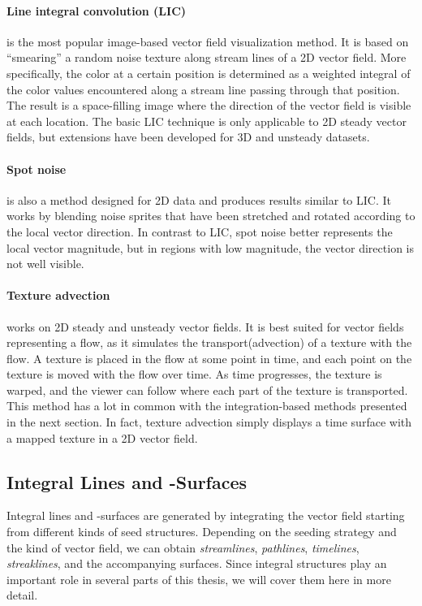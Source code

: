 %
\paragraph{Line integral convolution (\acs{LIC})} is the most
popular image-based vector field visualization method.
%
It is based on ``smearing'' a random noise texture along stream lines of a
\ac{2D} vector field.
%
More specifically, the color at a certain position is determined as a weighted
integral of the color values encountered along a stream line passing through
that position.
%
The result is a space-filling image where the direction of the vector field is
visible at each location.
%
The basic \ac{LIC} technique is only applicable to \ac{2D} steady vector fields,
but extensions have been developed for \ac{3D} and unsteady datasets.
%

%
\paragraph{Spot noise} is also a method designed for \ac{2D} data and produces
results similar to \ac{LIC}.
%
It works by blending noise sprites that have been stretched and rotated
according to the local vector direction.
%
In contrast to \ac{LIC}, spot noise better represents the local vector
magnitude, but in regions with low magnitude, the vector direction is not well
visible.
%

%
\paragraph{Texture advection} works on \ac{2D} steady and unsteady vector
fields.
%
It is best suited for vector fields representing a flow, as it simulates the
transport(advection) of a texture with the flow.
%
A texture is placed in the flow at some point in time, and each point on the
texture is moved with the flow over time.
%
As time progresses, the texture is warped, and the viewer can follow where each
part of the texture is transported.
%
This method has a lot in common with the integration-based methods presented in
the next section.
%
In fact, texture advection simply displays a time surface with a mapped texture
in a \ac{2D} vector field.
%

%
%
\subsection{Integral Lines and -Surfaces} %
\label{sub:integral_lines_and_surfaces}
%
Integral lines and -surfaces are generated by integrating the vector field
starting from different kinds of seed structures.
%
Depending on the seeding strategy and the kind of vector field, we can obtain
\emph{streamlines}, \emph{pathlines}, \emph{timelines}, \emph{streaklines},
and the accompanying surfaces.
%
Since integral structures play an important role in several parts of this
thesis, we will cover them here in more detail.
%
%

